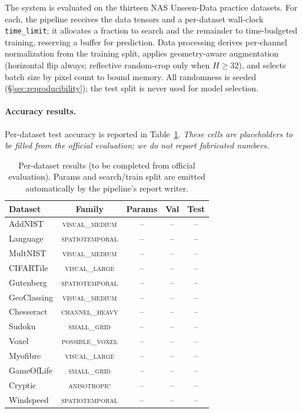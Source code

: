 \documentclass[10pt,twocolumn]{article}
\newcommand{\family}[1]{\textsc{#1}}
\newcommand{\code}[1]{\texttt{\small #1}}
\begin{document}
The system is evaluated on the thirteen NAS Unseen-Data practice datasets. For
each, the pipeline receives the data tensors and a per-dataset wall-clock
\code{time\_limit}; it allocates a fraction to search and the remainder to
time-budgeted training, reserving a buffer for prediction. Data processing
derives per-channel normalization from the training split, applies geometry-aware
augmentation (horizontal flip always; reflective random-crop only when
$H\!\ge\!32$), and selects batch size by pixel count to bound memory. All
randomness is seeded (\S\ref{sec:reproducibility}); the test split is never used
for model selection.

\paragraph{Accuracy results.} Per-dataset test accuracy is reported in
Table~\ref{tab:results}. \emph{These cells are placeholders to be filled from
the official evaluation; we do not report fabricated numbers.}

\begin{table}[t]
\centering
\caption{Per-dataset results (to be completed from official evaluation).
Params and search/train split are emitted automatically by the pipeline's
report writer.}
\label{tab:results}
\footnotesize
\begin{tabular}{@{}lcccc@{}}
\toprule
Dataset & Family & Params & Val & Test\\
\midrule
AddNIST     & \family{visual\_medium} & -- & -- & --\\
Language    & \family{spatiotemporal} & -- & -- & --\\
MultNIST    & \family{visual\_medium} & -- & -- & --\\
CIFARTile   & \family{visual\_large}  & -- & -- & --\\
Gutenberg   & \family{spatiotemporal} & -- & -- & --\\
GeoClassing & \family{visual\_medium} & -- & -- & --\\
Chesseract  & \family{channel\_heavy} & -- & -- & --\\
Sudoku      & \family{small\_grid}    & -- & -- & --\\
Voxel       & \family{possible\_voxel}& -- & -- & --\\
Myofibre    & \family{visual\_large}  & -- & -- & --\\
GameOfLife  & \family{small\_grid}    & -- & -- & --\\
Cryptic     & \family{anisotropic}    & -- & -- & --\\
Windspeed   & \family{spatiotemporal} & -- & -- & --\\
\bottomrule
\end{tabular}
\end{table}
\end{document}
